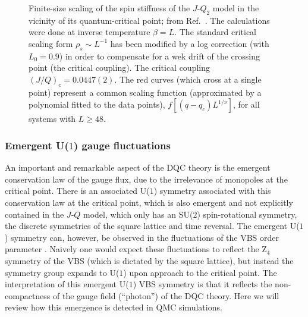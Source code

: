 \documentclass[range]{ar2e}
\begin{document}
\begin{figure}
\centerline{}
\caption{Finite-size scaling of the spin stiffness of the $J$-$Q_2$ model in the vicinity of its quantum-critical point; from Ref.~\cite{Sandvik10c}. The 
calculations were done at inverse temperature $\beta=L$. The standard critical scaling form $\rho_s \sim L^{-1}$ has been modified by a log correction 
(with $L_0=0.9$) in order to compensate for a wek drift of the crossing point (the critical coupling). The critical coupling $(J/Q)_c = 0.0447(2)$. The
red curves (which cross at a single point) represent a common scaling function (approximated by a polynomial fitted to the data points), $f[(q-q_c)L^{1/\nu}]$,
for all systems with $L\ge 48$.}
\label{jqrhos}
\end{figure}

\subsubsection{Emergent U($1$) gauge fluctuations}

An important and remarkable aspect of the DQC theory is the emergent conservation law of the gauge flux, due to the irrelevance of monopoles at the critical point. 
There is an associated U($1$) symmetry associated with this conservation law at the critical point, which is also emergent and not explicitly contained in 
the $J$-$Q$ model, which only has an SU($2$) spin-rotational symmetry, the discrete symmetries of the square lattice and time reversal. The emergent U($1$) 
symmetry can, however, be observed in the fluctuations of the VBS order parameter \cite{Sandvik07}. Naively one would expect these fluctuations 
to reflect the Z$_4$ symmetry of the VBS (which is dictated by the square lattice), but instead the symmetry group expands to U($1$) upon approach to the 
critical point. The interpretation of this emergent U($1$) VBS symmetry is that it reflects the non-compactness of the gauge field (``photon'') 
of the DQC theory. Here we will review how this emergence is detected in QMC simulations.
\end{document}
